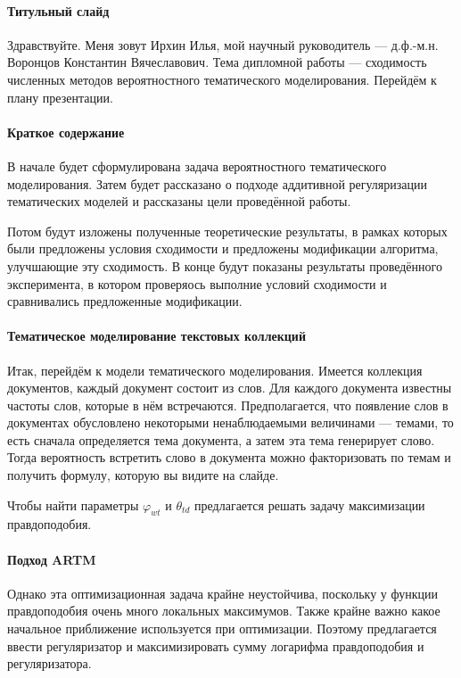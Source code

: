 \documentclass[12pt]{article}
\renewcommand{\phi}{\varphi}
\begin{document}
\paragraph{Титульный слайд}
Здравствуйте. Меня зовут Ирхин Илья, мой научный руководитель --- д.ф.-м.н. Воронцов Константин Вячеславович. Тема дипломной работы --- сходимость численных методов вероятностного тематического моделирования. Перейдём к плану презентации.

\paragraph{Краткое содержание}
В начале будет сформулирована задача вероятностного тематического моделирования. Затем будет рассказано о подходе аддитивной регуляризации тематических моделей и рассказаны цели проведённой работы.

Потом будут изложены полученные теоретические результаты, в рамках которых были предложены условия сходимости и предложены модификации алгоритма, улучшающие эту сходимость. В конце будут показаны результаты проведённого эксперимента, в котором проверяось выполние условий сходимости и сравнивались предложенные модификации.

\paragraph{Тематическое моделирование текстовых коллекций}
Итак, перейдём к модели тематического моделирования. Имеется коллекция документов, каждый документ состоит из слов. Для каждого документа известны частоты слов, которые в нём встречаются. Предполагается, что появление слов в документах обусловлено некоторыми ненаблюдаемыми величинами --- темами, то есть сначала определяется тема документа, а затем эта тема генерирует слово. Тогда вероятность встретить слово в документа можно факторизовать по темам и получить формулу, которую вы видите на слайде.

Чтобы найти параметры $\phi_{wt}$ и $\theta_{td}$ предлагается решать задачу максимизации правдоподобия. 

\paragraph{Подход ARTM}
Однако эта оптимизационная задача крайне неустойчива, поскольку у функции правдоподобия очень много локальных максимумов. Также крайне важно какое начальное приближение используется при оптимизации. Поэтому предлагается ввести регуляризатор и максимизировать сумму логарифма правдоподобия и регуляризатора.
\end{document}
